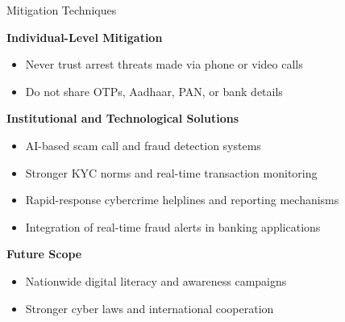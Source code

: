 \documentclass{beamer}
\begin{document}
\begin{frame}{Mitigation Techniques}

\textbf{Individual-Level Mitigation}
\begin{itemize}
  \item Never trust arrest threats made via phone or video calls
  \item Do not share OTPs, Aadhaar, PAN, or bank details
\end{itemize}

\vspace{0.3cm}

\textbf{Institutional and Technological Solutions}
\begin{itemize}
  \item AI-based scam call and fraud detection systems
  \item Stronger KYC norms and real-time transaction monitoring
  \item Rapid-response cybercrime helplines and reporting mechanisms
  \item Integration of real-time fraud alerts in banking applications
\end{itemize}

\vspace{0.3cm}

\textbf{Future Scope}
\begin{itemize}
  \item Nationwide digital literacy and awareness campaigns
  \item Stronger cyber laws and international cooperation
\end{itemize}

\end{frame}
\end{document}
